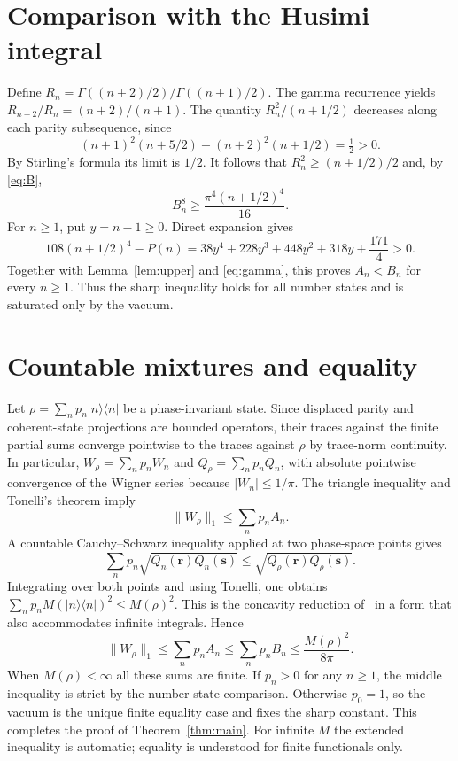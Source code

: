\documentclass[11pt]{article}
\newcommand{\ket}[1]{\lvert #1\rangle}
\newcommand{\bra}[1]{\langle #1\rvert}
\newcommand{\norm}[1]{\lVert #1\rVert}
\begin{document}
\section{Comparison with the Husimi integral}
Define $R_n=\Gamma((n+2)/2)/\Gamma((n+1)/2)$. The gamma recurrence yields $R_{n+2}/R_n=(n+2)/(n+1)$. The quantity $R_n^2/(n+1/2)$ decreases along each parity subsequence, since
\[
 (n+1)^2(n+5/2)-(n+2)^2(n+1/2)=\tfrac12>0.
\]
By Stirling's formula its limit is $1/2$. It follows that $R_n^2\geq(n+1/2)/2$ and, by \eqref{eq:B},
\begin{equation}\label{eq:gamma}
 B_n^8\geq\frac{\pi^4(n+1/2)^4}{16}.
\end{equation}
For $n\geq1$, put $y=n-1\geq0$. Direct expansion gives
\[
 108(n+1/2)^4-P(n)=38y^4+228y^3+448y^2+318y+\frac{171}{4}>0.
\]
Together with Lemma~\ref{lem:upper} and \eqref{eq:gamma}, this proves $A_n<B_n$ for every $n\geq1$. Thus the sharp inequality holds for all number states and is saturated only by the vacuum.

\section{Countable mixtures and equality}
Let $\rho=\sum_n p_n\ket n\bra n$ be a phase-invariant state. Since displaced parity and coherent-state projections are bounded operators, their traces against the finite partial sums converge pointwise to the traces against $\rho$ by trace-norm continuity. In particular, $W_\rho=\sum_n p_n W_n$ and $Q_\rho=\sum_n p_n Q_n$, with absolute pointwise convergence of the Wigner series because $|W_n|\leq1/\pi$. The triangle inequality and Tonelli's theorem imply
\[
 \norm{W_\rho}_1\leq\sum_n p_n A_n.
\]
A countable Cauchy--Schwarz inequality applied at two phase-space points gives
\[
 \sum_n p_n\sqrt{Q_n(\mathbf r)Q_n(\mathbf s)}
 \leq\sqrt{Q_\rho(\mathbf r)Q_\rho(\mathbf s)}.
\]
Integrating over both points and using Tonelli, one obtains $\sum_n p_n M(\ket n\bra n)^2\leq M(\rho)^2$. This is the concavity reduction of~\cite{gagatsos} in a form that also accommodates infinite integrals. Hence
\[
 \norm{W_\rho}_1\leq\sum_n p_n A_n\leq\sum_n p_n B_n\leq\frac{M(\rho)^2}{8\pi}.
\]
When $M(\rho)<\infty$ all these sums are finite. If $p_n>0$ for any $n\geq1$, the middle inequality is strict by the number-state comparison. Otherwise $p_0=1$, so the vacuum is the unique finite equality case and fixes the sharp constant. This completes the proof of Theorem~\ref{thm:main}. For infinite $M$ the extended inequality is automatic; equality is understood for finite functionals only.
\end{document}
